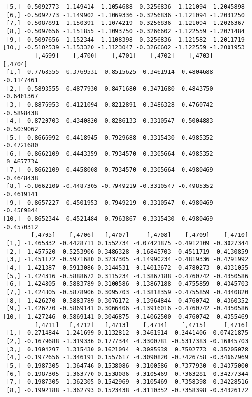 \documentclass[
  letterpaper,
  DIV=11,
  numbers=noendperiod]{scrreprt}
\begin{document}
\begin{verbatim}
 [5,] -0.5092773 -1.149414 -1.1054688 -0.3256836 -1.121094 -1.2045898
 [6,] -0.5092773 -1.149902 -1.1069336 -0.3256836 -1.121094 -1.2031250
 [7,] -0.5087891 -1.150391 -1.1074219 -0.3256836 -1.121094 -1.2026367
 [8,] -0.5097656 -1.151855 -1.1093750 -0.3266602 -1.122559 -1.2021484
 [9,] -0.5097656 -1.152344 -1.1108398 -0.3256836 -1.121582 -1.2011719
[10,] -0.5102539 -1.153320 -1.1123047 -0.3266602 -1.122559 -1.2001953
         [,4699]    [,4700]    [,4701]    [,4702]    [,4703]    [,4704]
 [1,] -0.7768555 -0.3769531 -0.8515625 -0.3461914 -0.4804688 -0.1147461
 [2,] -0.5893555 -0.4877930 -0.8471680 -0.3471680 -0.4843750 -0.6401367
 [3,] -0.8876953 -0.4121094 -0.8212891 -0.3486328 -0.4760742 -0.5898438
 [4,] -0.8720703 -0.4340820 -0.8286133 -0.3310547 -0.5004883 -0.5039062
 [5,] -0.8666992 -0.4418945 -0.7929688 -0.3315430 -0.4985352 -0.4721680
 [6,] -0.8662109 -0.4443359 -0.7934570 -0.3305664 -0.4985352 -0.4677734
 [7,] -0.8662109 -0.4458008 -0.7934570 -0.3305664 -0.4980469 -0.4648438
 [8,] -0.8662109 -0.4487305 -0.7949219 -0.3310547 -0.4985352 -0.4619141
 [9,] -0.8657227 -0.4501953 -0.7949219 -0.3310547 -0.4980469 -0.4589844
[10,] -0.8652344 -0.4521484 -0.7963867 -0.3315430 -0.4980469 -0.4570312
        [,4705]    [,4706]   [,4707]     [,4708]    [,4709]    [,4710]
 [1,] -1.465332 -0.4428711 0.1552734 -0.07421875 -0.4912109 -0.3027344
 [2,] -1.457520 -0.5253906 0.3486328 -0.16845703 -0.4511719 -0.4130859
 [3,] -1.451172 -0.5971680 0.3237305 -0.14990234 -0.4819336 -0.4291992
 [4,] -1.421387 -0.5913086 0.3144531 -0.14013672 -0.4780273 -0.4331055
 [5,] -1.424316 -0.5888672 0.3115234 -0.13867188 -0.4760742 -0.4350586
 [6,] -1.424805 -0.5883789 0.3100586 -0.13867188 -0.4755859 -0.4345703
 [7,] -1.424805 -0.5878906 0.3095703 -0.13818359 -0.4755859 -0.4340820
 [8,] -1.426270 -0.5883789 0.3076172 -0.13964844 -0.4760742 -0.4360352
 [9,] -1.426270 -0.5869141 0.3066406 -0.13916016 -0.4760742 -0.4350586
[10,] -1.427246 -0.5869141 0.3046875 -0.14062500 -0.4760742 -0.4355469
         [,4711]   [,4712]   [,4713]    [,4714]    [,4715]     [,4716]
 [1,] -0.2714844 -1.241699 0.1132812 -0.3461914 -0.2441406 -0.07421875
 [2,] -0.1679688 -1.319336 0.1777344 -0.3300781 -0.5317383 -0.16845703
 [3,] -0.1904297 -1.315430 0.1621094 -0.3085938 -0.7592773 -0.35205078
 [4,] -0.1972656 -1.346191 0.1557617 -0.3090820 -0.7426758 -0.34667969
 [5,] -0.1987305 -1.364746 0.1538086 -0.3100586 -0.7377930 -0.34375000
 [6,] -0.1987305 -1.363770 0.1538086 -0.3105469 -0.7363281 -0.34277344
 [7,] -0.1987305 -1.362305 0.1542969 -0.3105469 -0.7358398 -0.34228516
 [8,] -0.1992188 -1.362793 0.1523438 -0.3110352 -0.7358398 -0.34326172

\end{verbatim}
\end{document}
